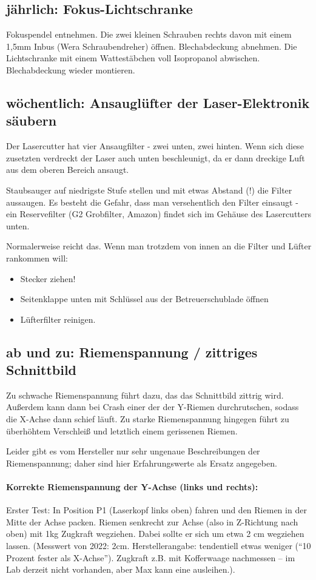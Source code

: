 \documentclass{\basedir/fablab-document}
\begin{document}
\subsection{jährlich: Fokus-Lichtschranke}
Fokuspendel entnehmen. Die zwei kleinen Schrauben rechts davon mit einem 1,5mm Inbus (Wera Schraubendreher) öffnen. Blechabdeckung abnehmen. Die Lichtschranke mit einem Wattestäbchen voll Isopropanol abwischen. Blechabdeckung wieder montieren.

\subsection{wöchentlich: Ansauglüfter der Laser-Elektronik säubern}
	Der Lasercutter hat vier Ansaugfilter - zwei unten, zwei hinten. Wenn sich diese zusetzten verdreckt der Laser auch unten beschleunigt, da er dann dreckige Luft aus dem oberen Bereich ansaugt.

	 Staubsauger auf niedrigste Stufe stellen und mit etwas Abstand (!) die Filter aussaugen. Es besteht die Gefahr, dass man versehentlich den Filter einsaugt - ein Reservefilter (G2 Grobfilter, Amazon) findet sich im Gehäuse des Lasercutters unten.

	Normalerweise reicht das. Wenn man trotzdem von innen an die Filter und Lüfter rankommen will:
	\begin{itemize}
		\item Stecker ziehen!
		\item Seitenklappe unten mit Schlüssel aus der Betreuerschublade öffnen
		\item Lüfterfilter reinigen.
	\end{itemize}

\subsection{ab und zu: Riemenspannung / zittriges Schnittbild}
	Zu schwache Riemenspannung führt dazu, das das Schnittbild zittrig wird. Außerdem kann dann bei Crash einer der der Y-Riemen durchrutschen, sodass die X-Achse dann schief läuft. Zu starke Riemenspannung hingegen führt zu überhöhtem Verschleiß und letztlich einem gerissenen Riemen.

	Leider gibt es vom Hersteller nur sehr ungenaue Beschreibungen der Riemenspannung; daher sind hier Erfahrungswerte als Ersatz angegeben.

	\paragraph{Korrekte Riemenspannung der Y-Achse (links und rechts):} Erster Test: In Position P1 (Laserkopf links oben) fahren und den Riemen in der Mitte der Achse packen. Riemen senkrecht zur Achse (also in Z-Richtung nach oben) mit 1kg Zugkraft wegziehen. Dabei sollte er sich um etwa 2 cm wegziehen lassen. (Messwert von 2022: 2cm. Herstellerangabe: tendentiell etwas weniger (\enquote{10 Prozent fester als X-Achse}). Zugkraft z.B. mit Kofferwaage nachmessen -- im Lab derzeit nicht vorhanden, aber Max kann eine ausleihen.).
\end{document}
